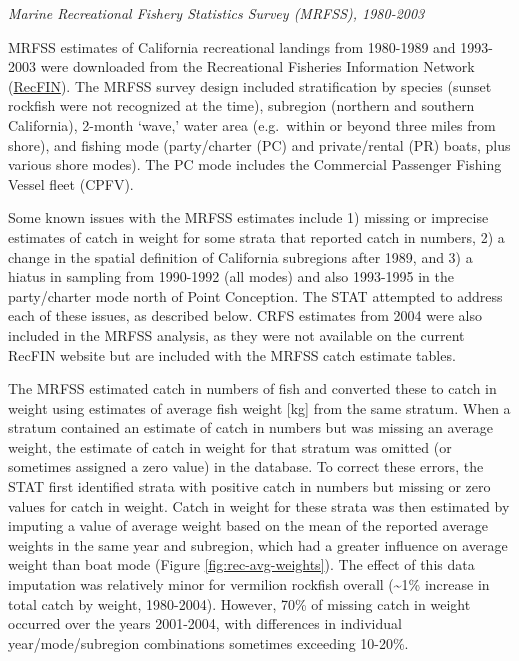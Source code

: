 \documentclass[11pt,
  english,
]{article}
\begin{document}
\emph{Marine Recreational Fishery Statistics Survey (MRFSS), 1980-2003}

MRFSS estimates of California recreational landings from 1980-1989 and 1993-2003 were downloaded from the Recreational Fisheries Information Network ({\href{https://www.recfin.org/}{RecFIN}\leavevmode\tagmcend\tagstructend}). The MRFSS survey design included stratification by species (sunset rockfish were not recognized at the time), subregion (northern and southern California), 2-month `wave,' water area (e.g.~within or beyond three miles from shore), and fishing mode (party/charter (PC) and private/rental (PR) boats, plus various shore modes). The PC mode includes the Commercial Passenger Fishing Vessel fleet (CPFV).

Some known issues with the MRFSS estimates include 1) missing or imprecise estimates of catch in weight for some strata that reported catch in numbers, 2) a change in the spatial definition of California subregions after 1989, and 3) a hiatus in sampling from 1990-1992 (all modes) and also 1993-1995 in the party/charter mode north of Point Conception. The STAT attempted to address each of these issues, as described below. CRFS estimates from 2004 were also included in the MRFSS analysis, as they were not available on the current RecFIN website but are included with the MRFSS catch estimate tables.

The MRFSS estimated catch in numbers of fish and converted these to catch in weight using estimates of average fish weight {[}kg{]} from the same stratum. When a stratum contained an estimate of catch in numbers but was missing an average weight, the estimate of catch in weight for that stratum was omitted (or sometimes assigned a zero value) in the database. To correct these errors, the STAT first identified strata with positive catch in numbers but missing or zero values for catch in weight. Catch in weight for these strata was then estimated by imputing a value of average weight based on the mean of the reported average weights in the same year and subregion, which had a greater influence on average weight than boat mode (Figure \ref{fig:rec-avg-weights}). The effect of this data imputation was relatively minor for vermilion rockfish overall (\textasciitilde1\% increase in total catch by weight, 1980-2004). However, 70\% of missing catch in weight occurred over the years 2001-2004, with differences in individual year/mode/subregion combinations sometimes exceeding 10-20\%.
\end{document}
